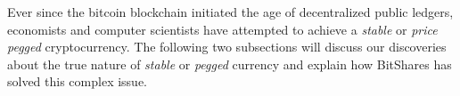 Ever since the bitcoin blockchain initiated the age of decentralized public
ledgers, economists and computer scientists have attempted to achieve a
\emph{stable} or \emph{price pegged} cryptocurrency. The following two
subsections will discuss our discoveries about the true nature of \emph{stable}
or \emph{pegged} currency and explain how BitShares has solved this complex
issue.
